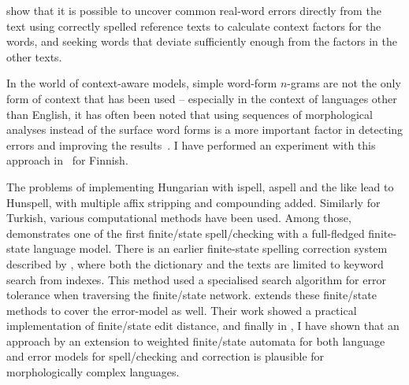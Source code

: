 \documentclass[officiallayout,final]{unihelcompling}
\begin{document}
\citet{al2006learning} show that it is possible to uncover common real-word
errors directly from the text using correctly spelled reference texts to
calculate context factors for the words, and seeking words that deviate
sufficiently enough from the factors in the other texts.

In the world of context-aware models, simple word-form \(n\)-grams are not the
only form of context that has been used -- especially in the context of
languages other than English, it has often been noted that using sequences of
morphological analyses instead of the surface word forms is a more important
factor in detecting errors and improving the results~\citep[for
Spanish]{otero2007contextual}. I have performed an experiment with this
approach in~ for Finnish.

The problems of implementing Hungarian with ispell, aspell and the like lead to
Hunspell, with multiple affix stripping and compounding added. Similarly for
Turkish, various computational methods have been used. Among those,
\citet{oflazer1996errortolerant} demonstrates one of the first finite\-/state
spell\-/checking with a full-fledged finite-state language model.  There is an
earlier finite-state spelling correction system described by
\citet{aho1975efficient}, where both the dictionary and the texts are limited
to keyword search from indexes.  This method used a specialised search
algorithm for error tolerance when traversing the finite\-/state network.
\citet{agata2002typographical} extends these finite\-/state methods to cover
the error-model as well. Their work showed a practical implementation of
finite\-/state edit distance, and finally in
, I have shown that an approach by an
extension to weighted finite\-/state automata for both language and error
models for spell\-/checking and correction is plausible for
morphologically complex languages.


\end{document}
